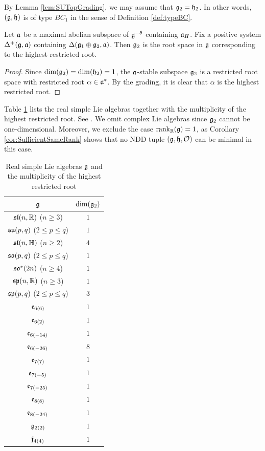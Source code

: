 By Lemma \ref{lem:SUTopGrading}, we may assume that $\mathfrak{g}_2 = \mathfrak{h}_2$.
In other words, $(\mathfrak{g}, \mathfrak{h})$ is of type $BC_1$ in the sense of Definition \ref{def:typeBC}.

\begin{lemma} \label{lem:G2RootSpace}
	Let $\mathfrak{a}$ be a maximal abelian subspace of $\mathfrak{g}^{-\theta}$ containing $\mathfrak{a}_H$.
	Fix a positive system $\Delta^+(\mathfrak{g}, \mathfrak{a})$ containing $\Delta(\mathfrak{g}_1\oplus \mathfrak{g}_2, \mathfrak{a})$.
	Then $\mathfrak{g}_2$ is the root space in $\mathfrak{g}$ corresponding to the highest restricted root.
\end{lemma}

\begin{proof}
	Since $\dim(\mathfrak{g}_2) = \dim(\mathfrak{h}_2) = 1$, the $\mathfrak{a}$-stable subspace $\mathfrak{g}_2$ is a restricted root space with restricted root $\alpha \in \mathfrak{a}^*$.
	By the grading, it is clear that $\alpha$ is the highest restricted root.
\end{proof}

Table \ref{table:MultiplicityHighestRoot} lists the real simple Lie algebras together with the multiplicity of the highest restricted root.
See \cite[Appendices C.3 and C.4]{Kn02}.
We omit complex Lie algebras since $\mathfrak{g}_2$ cannot be one-dimensional.
Moreover, we exclude the case $\operatorname{rank}_{\mathbb{R}}(\mathfrak{g})=1$, as Corollary \ref{cor:SufficientSameRank} shows that no NDD tuple $(\mathfrak{g}, \mathfrak{h}, \mathcal{O})$ can be minimal in this case.

\begin{table}[htbp]
	\centering
	\begin{tabular}{c|c}
		$\mathfrak{g}$ & $\dim(\mathfrak{g}_{2})$ \\
		\hline
		$\mathfrak{sl}(n, \mathbb{R})$ ($n \geq 3$) & $1$ \\
		$\mathfrak{su}(p, q)$ ($2 \leq p \leq q$) & $1$ \\
		$\mathfrak{sl}(n, \mathbb{H})$ ($n \geq 2$) & $4$ \\
		$\mathfrak{so}(p, q)$ ($2 \leq p \leq q$) & $1$ \\
		$\mathfrak{so}^*(2n)$ ($n \geq 4$) & $1$ \\
		$\mathfrak{sp}(n, \mathbb{R})$ ($n \geq 3$) & $1$ \\
		$\mathfrak{sp}(p, q)$ ($2 \leq p \leq q$) & $3$ \\
		$\mathfrak{e}_{6(6)}$ & $1$ \\
		$\mathfrak{e}_{6(2)}$ & $1$ \\
		$\mathfrak{e}_{6(-14)}$ & $1$ \\
		$\mathfrak{e}_{6(-26)}$ & $8$ \\
		$\mathfrak{e}_{7(7)}$ & $1$ \\
		$\mathfrak{e}_{7(-5)}$ & $1$ \\
		$\mathfrak{e}_{7(-25)}$ & $1$ \\
		$\mathfrak{e}_{8(8)}$ & $1$ \\
		$\mathfrak{e}_{8(-24)}$ & $1$ \\
		$\mathfrak{g}_{2(2)}$ & $1$ \\
		$\mathfrak{f}_{4(4)}$ & $1$ \\
	\end{tabular}
	\caption{Real simple Lie algebras $\mathfrak{g}$ and the multiplicity of the highest restricted root}
	\label{table:MultiplicityHighestRoot}
\end{table}

